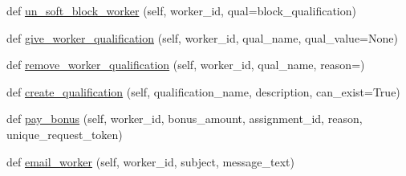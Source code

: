 \begin{DoxyCompactItemize}
\item 
def \hyperlink{classparlai_1_1mturk_1_1webapp_1_1run__mocks_1_1mock__turk__manager_1_1MockTurkManager_aae46bbb83c583f1f36da2f7263cf59ce}{un\+\_\+soft\+\_\+block\+\_\+worker} (self, worker\+\_\+id, qual=\textquotesingle{}block\+\_\+qualification\textquotesingle{})
\item 
def \hyperlink{classparlai_1_1mturk_1_1webapp_1_1run__mocks_1_1mock__turk__manager_1_1MockTurkManager_aac519b64f973b77c968178d15b46bc72}{give\+\_\+worker\+\_\+qualification} (self, worker\+\_\+id, qual\+\_\+name, qual\+\_\+value=None)
\item 
def \hyperlink{classparlai_1_1mturk_1_1webapp_1_1run__mocks_1_1mock__turk__manager_1_1MockTurkManager_ac70157931deafc3b0369897dec105041}{remove\+\_\+worker\+\_\+qualification} (self, worker\+\_\+id, qual\+\_\+name, reason=\textquotesingle{}\textquotesingle{})
\item 
def \hyperlink{classparlai_1_1mturk_1_1webapp_1_1run__mocks_1_1mock__turk__manager_1_1MockTurkManager_a748672f15ceacbb1e4ca98461972978a}{create\+\_\+qualification} (self, qualification\+\_\+name, description, can\+\_\+exist=True)
\item 
def \hyperlink{classparlai_1_1mturk_1_1webapp_1_1run__mocks_1_1mock__turk__manager_1_1MockTurkManager_a01684c9ee2f88571eb873d5cc6061c21}{pay\+\_\+bonus} (self, worker\+\_\+id, bonus\+\_\+amount, assignment\+\_\+id, reason, unique\+\_\+request\+\_\+token)
\item 
def \hyperlink{classparlai_1_1mturk_1_1webapp_1_1run__mocks_1_1mock__turk__manager_1_1MockTurkManager_a36641c93bb824e26b0570b345cca7bcf}{email\+\_\+worker} (self, worker\+\_\+id, subject, message\+\_\+text)
\end{DoxyCompactItemize}
